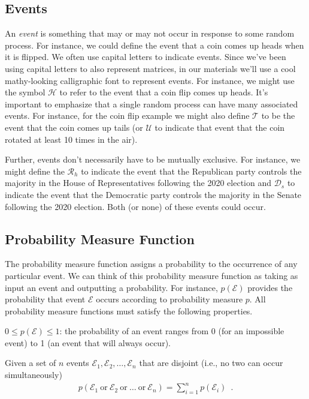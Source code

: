 \documentclass[assignment01_Solutions]{subfiles}
\begin{document}
\subsection{Events}

An \emph{event} is something that may or may not occur in response to some random process.  For instance, we could define the event that a coin comes up heads when it is flipped.  We often use capital letters to indicate events.  Since we've been using capital letters to also represent matrices, in our materials we'll use a cool mathy-looking calligraphic font to represent events.  For instance, we might use the symbol $\mathcal{H}$ to refer to the event that a coin flip comes up heads. It's important to emphasize that a single random process can have many associated events.   For instance, for the coin flip example we might also define $\mathcal{T}$ to be the event that the coin comes up tails (or $\mathcal{U}$ to indicate that event that the coin rotated at least 10 times in the air).

Further, events don't necessarily have to be mutually exclusive.  For instance, we might define the $\mathcal{R}_h$ to indicate the event that the Republican party controls the majority in the House of Representatives following the 2020 election and $\mathcal{D}_s$ to indicate the event that the Democratic party controls the majority in the Senate following the 2020 election.  Both (or none) of these events could occur.

\subsection{Probability Measure Function}
The probability measure function assigns a probability to the occurrence of any particular event.  We can think of this probability measure function as taking as input an event and outputting a probability.  For instance, $p(\mathcal{E})$ provides the probability that event $\mathcal{E}$ occurs according to probability measure $p$.  All probability measure functions must satisfy the following properties.

\bi
\item $0 \leq p(\mathcal{E}) \leq 1$: the probability of an event ranges from 0 (for an impossible event) to 1 (an event that will always occur).
\item Given a set of $n$ events $\mathcal{E}_1, \mathcal{E}_2, \ldots, \mathcal{E}_n$ that are disjoint (i.e., no two can occur simultaneously)
\begin{align}
p(\mathcal{E}_1~\mbox{or}~\mathcal{E}_2~\mbox{or}~\ldots~\mbox{or}~\mathcal{E}_n) = \sum_{i=1}^n p(\mathcal{E}_i) \label{eq:probunion} \enspace .
\end{align}
\end{document}
